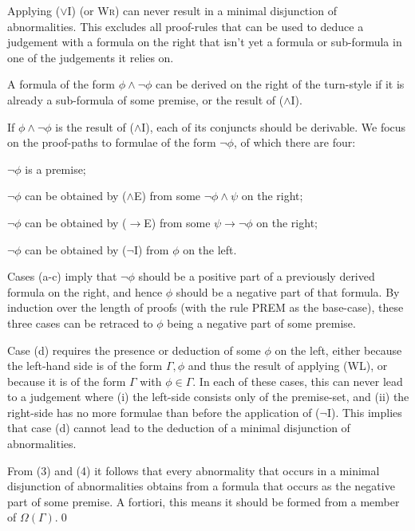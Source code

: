 \documentclass[]{article}
\begin{document}
\begin{enumerate*}
    \item Applying ($\vee$I) (or \textsc{Wr}) can never result in a minimal disjunction of abnormalities. This excludes all proof-rules that can be used to deduce a judgement with a formula on the right that isn't yet a formula or sub-formula in one of the judgements it relies on.
    \item A formula of the form $\phi \wedge \neg \phi$ can be derived on the right of the turn-style if it is already a sub-formula of some premise, or the result of ($\wedge$I).
    \item If $\phi \wedge \neg \phi$ is the result of ($\wedge$I), each of its conjuncts should be derivable. We focus on the proof-paths to formulae of the form $\neg \phi$, of which there are four:
        \begin{enumerate*}
            \item $\neg \phi$ is a premise;
            \item $\neg \phi$ can be obtained by ($\wedge$E) from some $\neg \phi \wedge \psi$ on the right;
            \item $\neg \phi$ can be obtained by ($\to$E) from some $\psi \to \neg \phi$ on the right;
            \item $\neg \phi$ can be obtained by ($\neg$I) from $\phi$ on the left.
        \end{enumerate*}
        Cases (a-c) imply that $\neg \phi$ should be a positive part of a previously derived formula on the right, and hence $\phi$ should be a negative part of that formula. By induction over the length of proofs (with the rule {\sf PREM}  as the base-case), these three cases can be retraced to $\phi$ being a negative part of some premise.
    \item Case (d) requires the presence or deduction of some $\phi$ on the left, either because the left-hand side is of the form $\Gamma, \phi$ and thus the result of applying (\textsf{WL}), or because it is of the form $\Gamma$ with $\phi \in \Gamma$. In each of these cases, this can never lead to a judgement where (i) the left-side consists only of the premise-set, and (ii) the right-side has no more formulae than before the application of ($\neg$I). This implies that case (d) cannot lead to the deduction of a minimal disjunction of abnormalities.
\end{enumerate*}
From (3) and (4) it follows that every abnormality that occurs in a minimal disjunction of abnormalities obtains from a formula that occurs as the negative part of some premise. A fortiori, this means it should be formed from a member of $\Omega(\Gamma)$.\qed
\end{document}
